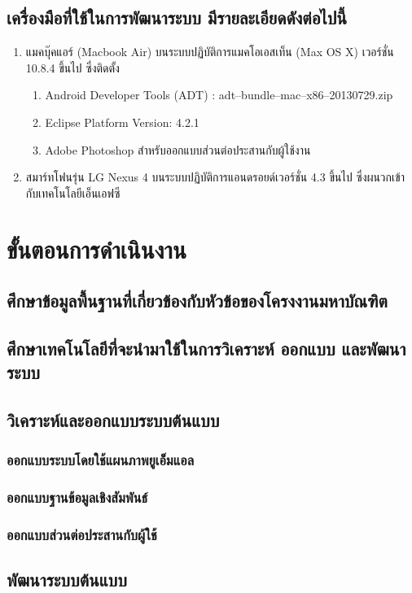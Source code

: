\documentclass[a4paper]{article}
\begin{document}
\subsection{เครื่องมือที่ใช้ในการพัฒนาระบบ มีรายละเอียดดังต่อไปนี้}
\begin{enumerate}
	\item แมคบุ๊คแอร์ (Macbook Air) บนระบบปฏิบัติการแมคโอเอสเท็น (Max OS X) เวอร์ชั่น 10.8.4 ขึ้นไป ซึ่งติดตั้ง
	\begin{enumerate}
		\item Android Developer Tools (ADT) : adt--bundle--mac--x86--20130729.zip
		\item Eclipse Platform Version: 4.2.1
		\item Adobe Photoshop สำหรับออกแบบส่วนต่อประสานกับผู้ใช้งาน
	\end{enumerate}
  	\item สมาร์ทโฟนรุ่น LG Nexus 4 บนระบบปฏิบัติการแอนดรอยด์เวอร์ชั่น 4.3 ขึ้นไป ซึ่งผนวกเข้ากับเทคโนโลยีเอ็นเอฟซี
\end{enumerate}

\section{ขั้นตอนการดำเนินงาน}
\subsection{ศึกษาข้อมูลพื้นฐานที่เกี่ยวข้องกับหัวข้อของโครงงานมหาบัณฑิต}
\subsection{ศึกษาเทคโนโลยีที่จะนํามาใช้ในการวิเคราะห์ ออกแบบ และพัฒนาระบบ}
\subsection{วิเคราะห์และออกแบบระบบต้นแบบ}
\subsubsection{ออกแบบระบบโดยใช้แผนภาพยูเอ็มแอล}
\subsubsection{ออกแบบฐานข้อมูลเชิงสัมพันธ์}
\subsubsection{ออกแบบส่วนต่อประสานกับผู้ใช้}
\subsection{พัฒนาระบบต้นแบบ}
\end{document}
